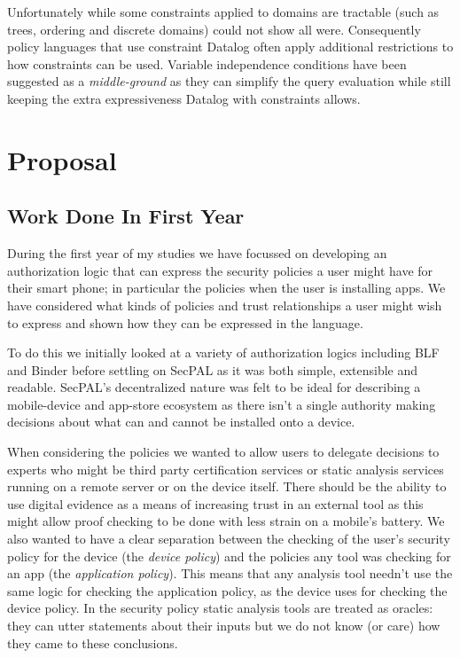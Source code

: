 \documentclass[a4paper,sfsidenotes]{tufte-book}
\begin{document}
Unfortunately while some constraints applied to domains are tractable (such as
trees, ordering and discrete domains) \citeauthor*{Li:2003ix} could not show
all were.  Consequently policy languages that use constraint Datalog often apply
additional restrictions to how constraints can be used.  Variable independence
conditions\cite{Chomicki:2000tz} have been suggested as a \emph{middle-ground}
as they can simplify the query evaluation while still keeping the extra
expressiveness Datalog with constraints allows.


\section{Proposal}

\subsection{Work Done In First Year}

During the first year of my studies we have focussed on developing an
authorization logic that can express the security policies a user might have for
their smart phone; in particular the policies when the user is installing apps.
We have considered what kinds of policies and trust
relationships a user might wish to express and shown how they can be expressed
in the language.

To do this we initially looked at a variety of authorization logics including
BLF\cite{Whitehead:2004bu} and Binder\cite{DeTreville:2002ff} before settling on
SecPAL as it was both simple, extensible and readable.  SecPAL's decentralized
nature was felt to be ideal for describing a mobile-device and app-store
ecosystem as there isn't a single authority making decisions about what can and
cannot be installed onto a device.  

When considering the policies we wanted to allow users to delegate decisions to
experts who might be third party certification services or static analysis
services running on a remote server or on the device itself.  There should be
the ability to use digital evidence\cite{Stark:2009uc} as a means of increasing
trust in an external tool as this might allow proof checking to be done with
less strain on a mobile's battery.  We also wanted to have a clear separation
between the checking of the user's security policy for the device (the
\emph{device policy}) and the policies any tool was checking for an app (the
\emph{application policy}).  This means that any analysis tool needn't use the
same logic for checking the application policy, as the device uses for checking
the device policy.  In the security policy static analysis tools are treated as
oracles: they can utter statements about their inputs but we do not know (or
care) how they came to these conclusions.
\end{document}
